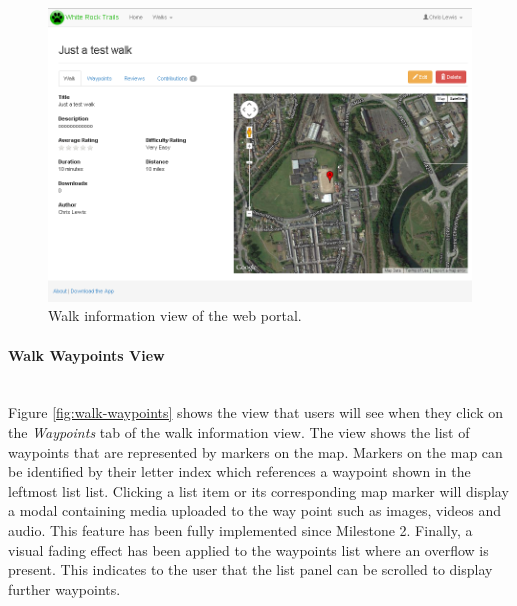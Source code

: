 \documentclass[11pt,a4paper]{report}
\begin{document}
\begin{figure}[H]

\centering

\includegraphics[width=1\linewidth]{./img/webportal/walk-info}

\caption{Walk information view of the web portal.}

\label{fig:walk-info}

\end{figure}

\paragraph{Walk Waypoints View}\mbox{}\\
Figure \ref{fig:walk-waypoints} shows the view that users will see when they click on the \emph{Waypoints} tab of the walk information view. The view shows the list of waypoints that are represented by markers on the map. Markers on the map can be identified by their letter index which references a waypoint shown in the leftmost list list. Clicking a list item or its corresponding map marker will display a modal containing media uploaded to the way point such as images, videos and audio. This feature has been fully implemented since Milestone 2. Finally, a visual fading effect has been applied to the waypoints list where an overflow is present. This indicates to the user that the list panel can be scrolled to display further waypoints.
\end{document}
